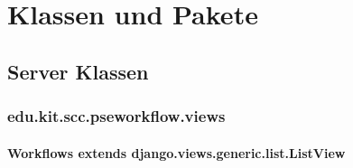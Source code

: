 \chapter{Klassen und Pakete}

    \section{Server Klassen}

    \subsection{edu.kit.scc.pseworkflow.views}

		\subsubsection{Workflows\newline
		extends django.views.generic.list.ListView}

